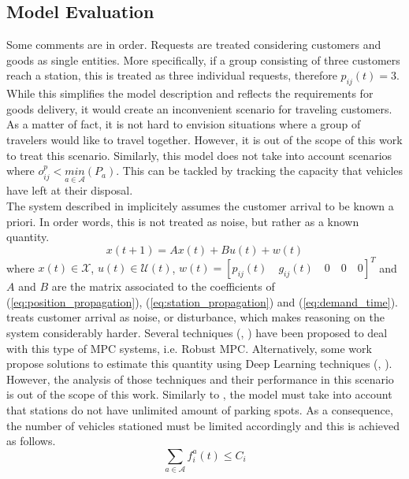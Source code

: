 \subsection{Model Evaluation}
Some comments are in order. Requests are treated considering customers and goods as single entities. More specifically, if a group consisting of three customers reach a station, this is treated as three individual requests, therefore $p_{ij}(t) = 3$. While this simplifies the model description and reflects the requirements for goods delivery, it would create an inconvenient scenario for traveling customers. As a matter of fact, it is not hard to envision situations where a group of travelers would like to travel together. However, it is out of the scope of this work to treat this scenario. Similarly, this model does not take into account scenarios where $o^p_{ij} <\underset{ a \in \mathcal{A}}{min}(P_a)$. This can be tackled by tracking the capacity that vehicles have left  at their disposal.\\
The system described in  implicitely assumes the customer arrival to be known a priori. In order words, this is not treated as noise, but rather as a known quantity. 
\begin{equation}
	x(t+1) = Ax(t) + Bu(t) + w(t)\label{eq:disturbed_mpc_formulation}
\end{equation}
where $x(t) \in \mathcal{X}$, $u(t) \in \mathcal{U}(t)$, $w(t) = [p_{ij}(t)\quad g_{ij}(t)\quad0\quad0 \quad0]^T$ and $A$ and $B$ are the matrix associated to the coefficients of (\ref{eq:position_propagation}), (\ref{eq:station_propagation}) and (\ref{eq:demand_time}). \\
 treats customer arrival as noise, or disturbance, which makes reasoning on the system considerably harder. Several techniques (\cite{Campo1987RobustMP}, \cite{LANGSON2004125}) have been proposed to deal with this type of MPC systems, i.e. Robust MPC.  Alternatively, some work propose solutions to estimate this quantity using Deep Learning techniques (\cite{9202791}, \cite{8569427}).
However, the analysis of those techniques and their performance in this scenario is out of the scope of this work.
Similarly to , the model must take into account that stations do not have unlimited amount of parking spots. As a consequence, the number of vehicles stationed must be limited accordingly and this is achieved as follows. 
\begin{equation}
	\sum_{a \in \mathcal{A}}f^a_i(t) \leq C_i
	\label{eq:parking_limit}
\end{equation}
